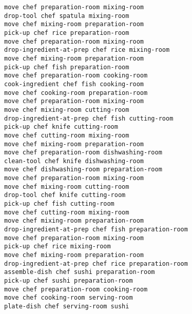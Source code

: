 \documentclass[a4paper,12pt]{article}
\begin{document}
\begin{lstlisting}[language=PDDL, caption=Plan for Problem 1]
move chef preparation-room mixing-room 
drop-tool chef spatula mixing-room 
move chef mixing-room preparation-room 
pick-up chef rice preparation-room 
move chef preparation-room mixing-room 
drop-ingredient-at-prep chef rice mixing-room 
move chef mixing-room preparation-room 
pick-up chef fish preparation-room 
move chef preparation-room cooking-room 
cook-ingredient chef fish cooking-room 
move chef cooking-room preparation-room 
move chef preparation-room mixing-room 
move chef mixing-room cutting-room 
drop-ingredient-at-prep chef fish cutting-room 
pick-up chef knife cutting-room 
move chef cutting-room mixing-room 
move chef mixing-room preparation-room 
move chef preparation-room dishwashing-room 
clean-tool chef knife dishwashing-room 
move chef dishwashing-room preparation-room 
move chef preparation-room mixing-room 
move chef mixing-room cutting-room 
drop-tool chef knife cutting-room 
pick-up chef fish cutting-room 
move chef cutting-room mixing-room 
move chef mixing-room preparation-room 
drop-ingredient-at-prep chef fish preparation-room 
move chef preparation-room mixing-room 
pick-up chef rice mixing-room 
move chef mixing-room preparation-room 
drop-ingredient-at-prep chef rice preparation-room 
assemble-dish chef sushi preparation-room 
pick-up chef sushi preparation-room 
move chef preparation-room cooking-room 
move chef cooking-room serving-room 
plate-dish chef serving-room sushi
\end{lstlisting}
\end{document}
